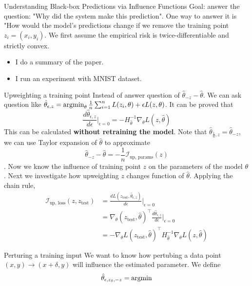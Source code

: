 \begin{frame}{Understanding Black-box Predictions via Influence Functions \cite{koh2017understanding}}
Goal: answer the question: "Why did the system make this prediction". One way to answer it is "How would the model's predictions change if we remove the training point $z_i = (x_i, y_i)$.
We first assume the empirical risk is twice-differentiable and strictly convex.
\begin{itemize}
\item I do a summary of the paper.
\item I run an experiment with MNIST dataset.
\end{itemize}
\end{frame}

\begin{frame}[allowframebreaks]{Upweighting a training point}
Instead of answer question of $\hat{\theta}_{-z} - \hat{\theta}$. We can ask question like $\hat{\theta}_{\epsilon, z} = \argmin_\theta \frac{1}{n} \sum_{i=1}^n L(z_i, \theta) + \epsilon L(z,\theta)$. 
It can be proved that 
$$\frac{d \hat{\theta}_{\epsilon, z}}{d \epsilon} |_{\epsilon=0} = -H^{-1}_{\hat{\theta}} \nabla_\theta L(z, \hat{\theta})$$
This can be calculated \textbf{without retraining the model}.
Note that $\hat{\theta}_{\frac{1}{n}, z} = \hat{\theta}_{-z}$, we can use Taylor expansion of $\hat{\theta}$ to approximate $$\hat{\theta}_{-z} - \hat{\theta} = -\frac{1}{n} \mathcal{I}_{\text{up, params}}(z)$$.
Now we know the influence of training point $z$ on the parameters of the model $\theta$. Next we investigate how upweighting $z$ changes function of $\hat{\theta}$. Applying the chain rule,
\begin{align*}
\mathcal{I}_{\text{up, loss}}(z, z_\text{test}) & = \frac{dL(z_\text{test}, \hat{\theta}_{\epsilon, z})}{d \epsilon} |_{\epsilon = 0} \\ 
& = \nabla_\theta (z_\text{test}, \hat{\theta})^\top \frac{d \hat{\theta}_{\epsilon, z}}{d\epsilon}|_{\epsilon = 0} \\ 
& = -\nabla_\theta L(z_\text{test}, \hat{\theta})^\top H_{\hat{\theta}}^{-1} \nabla_\theta L(z, \hat{\theta})
\end{align*}
\end{frame}
\begin{frame}[allowframebreaks]{Perturing a training input}
We want to know how pertubing a data point $(x,y) \rightarrow (x + \delta, y)$ will influence the estimated parameter. 
We define 
$$\hat{\theta}_{\epsilon, z_\delta, -z} = \argmin $$
\end{frame}